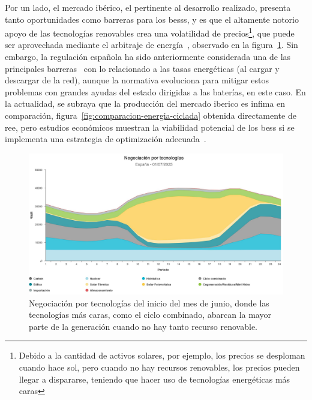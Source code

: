 Por un lado, el mercado ibérico, el pertinente al desarrollo realizado, presenta tanto oportunidades como barreras para los \glspl{bess}, y es que el altamente notorio apoyo de las tecnologías renovables crea una volatilidad de precios\footnote{Debido a la cantidad de activos solares, por ejemplo, los precios se desploman cuando hace sol, pero cuando no hay recursos renovables, los precios pueden llegar a dispararse, teniendo que hacer uso de tecnologías energéticas más caras}, que puede ser aprovechada mediante el arbitraje de energía~\cite{hu2022potential}, observado en la figura~\ref{fig:arbitraje-tecnologia}. Sin embargo, la regulación española ha sido anteriormente considerada una de las principales barreras~\cite{hu2021barriers} con lo relacionado a las tasas energéticas (al cargar y descargar de la red), aunque la normativa evoluciona para mitigar estos problemas con grandes ayudas del estado dirigidas a las baterías, en este caso. En la actualidad, se subraya que la producción del mercado iberico es infima en comparación, figura~\ref{fig:comparacion-energia-ciclada} obtenida directamente de \gls{ree}, pero estudios económicos muestran la viabilidad potencial de los \gls{bess} si se implementa una estrategia de optimización adecuada~\cite{he2015optimal}.

\begin{figure}
  \centering
  \includegraphics[width=0.75\linewidth]{figures/arbitraje-tecnologia.jpg}
  \caption{Negociación por tecnologías del inicio del mes de junio, donde las tecnologías más caras, como el ciclo combinado, abarcan la mayor parte de la generación cuando no hay tanto recurso renovable.}
  \label{fig:arbitraje-tecnologia}
\end{figure}

